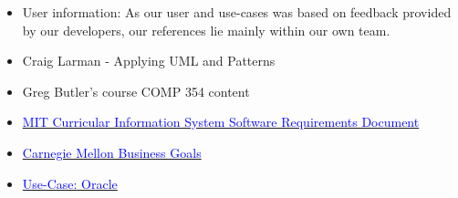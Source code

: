 \documentclass[11pt]{article}
\newcounter{use case ID}
\begin{document}
\begin{itemize}
    \item User information: As our user and use-cases was based on feedback provided by our developers, our references lie mainly within our own team.
    \item Craig Larman - Applying UML and Patterns
    \item Greg Butler's course COMP 354 content
    \item \href{http://web.mit.edu/ssit/cis/CISRequirements.html}{\textcolor{blue}{MIT Curricular Information System
        Software Requirements Document}}
    \item \href{https://resources.sei.cmu.edu/asset_files/TechnicalReport/2005_005_001_14621.pdf}{\textcolor{blue}{Carnegie Mellon Business Goals}}
    \item \href{http://www.oracle.com/technetwork/testcontent/gettingstartedwithusecasemodeling-133857.pdf}{\textcolor{blue}{Use-Case: Oracle }}

\end{itemize}
\end{document}
